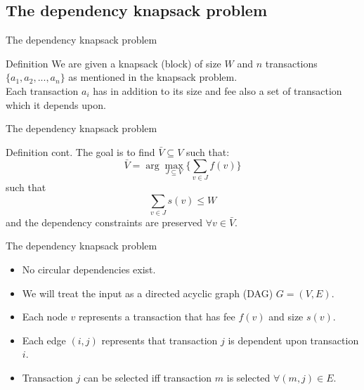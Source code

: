 \documentclass{beamer}
\begin{document}
\subsection*{The dependency knapsack problem}

\begin{frame}{The dependency knapsack problem} %
       \begin{block}{Definition}
    We are given a knapsack (block) of size $W$ and $n$ transactions 
    $ \{a_1,a_2,...,a_n\}$ as mentioned in the knapsack problem. \\ 
    Each transaction $a_i$ has in addition to its size and fee also a
    set of transaction which it depends upon. \\ 
    \end{block}
\end{frame}

\begin {frame}{The dependency knapsack problem} %
    \begin{block}{Definition cont.}
    The goal is to find $\bar V \subseteq V$ such that: \\
    $$ \bar V = \arg \max_{J\subseteq V} \{\sum_{v\in J} f(v)\}$$ such 
    that \\
    $$ \sum_{v \in J} s(v) \leq W $$
    and the dependency constraints are preserved $\forall v \in \bar V$.
    \end{block}
\end{frame}

\begin{frame}{The dependency knapsack problem} %
    \begin{itemize}
        \item  {No circular dependencies exist.}
        \item {We will treat the input as a directed acyclic graph (DAG)
        $ G = (V,E)$.}
        \item {Each node $v$ represents a transaction that has fee $f(v)$ 
        and size $s(v)$.}
        \item { Each edge $(i,j)$ represents that transaction $j$ is 
        dependent upon transaction $i$.}
        \item {Transaction $j$ can be selected iff transaction $m$ is 
        selected $\forall (m,j)\in E$.}
    \end{itemize}
\end{frame}
\end{document}
